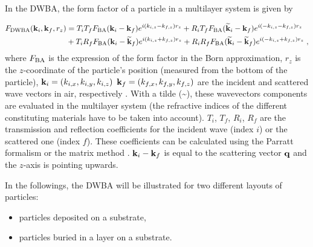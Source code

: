  In the DWBA, the form factor of a particle in a multilayer system is given by

\begin{align}
F_{\rm{DWBA}} (\mathbf{k}_i,\mathbf{k}_f, r_z) & = T_i T_f F_{\rm{BA}} (\mathbf{k}_i-\mathbf{k}_f) e^{i (k_{i,z}-k_{f,z}) r_z} + R_i T_f F_{\rm{BA}}(\mathbf{\widetilde{k}}_i-\mathbf{k}_f) e^{i(-k_{i,z}-k_{f,z})r_z}
 \nonumber \\
  &+ T_i R_f F_{\rm{BA}}(\mathbf{k}_i-\mathbf{\widetilde{k}}_f)e^{i(k_{i,z}+k_{f,z})r_z} + R_iR_fF_{\rm{BA}} (\mathbf{\widetilde{k}}_i-\mathbf{\widetilde{k}}_f)e^{i(-k_{i,z}+k_{f,z})r_z} \; , \label{eq:dwbageneral}
\end{align}
where $F_{\rm{BA}}$ is the expression of the form factor in the Born approximation, $r_z$ is the $z$-coordinate of the particle's position (measured from the bottom of the particle), $\mathbf{k}_i=(k_{i,x}, k_{i,y}, k_{i,z})$ $\mathbf{k}_f=(k_{f,x}, k_{f,y}, k_{f,z})$ are the incident and scattered wave vectors in air, respectively \cite{RaSS95}. With a tilde (\~{}), these wavevectors components are evaluated in the multilayer system (the refractive indices of the different constituting materials have to be taken into account). 
$T_i$, $T_f$, $R_i$, $R_f$ are the transmission and reflection coefficients for the incident wave (index $i$) or the scattered one (index $f$). These coefficients can be calculated using the Parratt formalism \cite{Par54} or the matrix method \cite{BoWo99}. $\mathbf{k}_i-\mathbf{k}_f$ is equal to the scattering vector $\mathbf{q}$ and the $z$-axis is pointing upwards.\\


\vspace{18pt}

In the followings, the DWBA will be illustrated for two different layouts of particles: 
\begin{itemize}
\item particles deposited on a substrate,
\item particles buried in a layer on a substrate.
\end{itemize}


